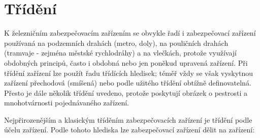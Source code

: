\section{Třídění}
  K železničním zabezpečovacím zařízením se obvykle řadí i zabezpečovací zařízení používaná na
  podzemních drahách (metro, doly), na pouličních drahách (tramvaje - zejména městské rychlodráhy) 
  a na vlečkách, protože využívají obdobných principů, často i obdobná nebo jen poněkud upravená 
  zařízení. Při třídění zařízení lze použít řadu třídících hledisek; téměř vždy se však vyskytnou 
  zařízení přechodová (smíšená) nebo podle užitého třídění obtížně definovatelná. Přesto je dále 
  několik třídění uvedeno, protože poskytují obrázek o pestrosti a mnohotvárnosti pojednávaného 
  zařízení. 
  
  Nejpřirozenějším a klasickým tříděním zabezpečovacích zařízení je třídění podle účelu zařízení.
  Podle tohoto hlediska lze zabezpečovací zařízení dělit na zařízení:
